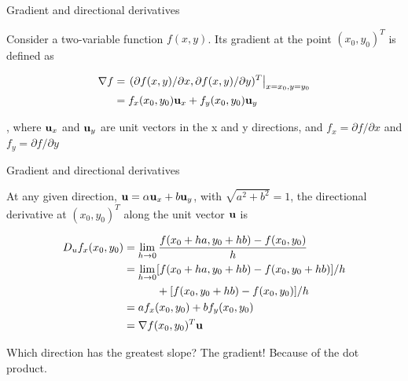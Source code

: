 \documentclass[notes]{beamer}
\begin{document}
\begin{frame}{Gradient and directional derivatives}

Consider a two-variable function \(f(x,y)\). Its gradient at the point
\((x_0 ,y_0)^T\) is defined as

\begin{equation*}
    \begin{aligned}
        \nabla f & = \left. (\partial f(x,y) / \partial x , \partial f(x,y) / \partial y)^T \right|_{x=x_0,y=y_0}   \\ 
        & = f_x(x_0,y_0) \mathbf{u}_x + f_y(x_0,y_0) \mathbf{u}_y 
    \end{aligned}
\end{equation*}

, where \(\mathbf{u}_x\) and \(\mathbf{u}_y\) are unit vectors in the x and y
directions, and \(f_x=\partial f / \partial x\) and
\(f_y = \partial f / \partial y\)

\end{frame}

\begin{frame}{Gradient and directional derivatives}

At any given direction, \(\mathbf{u} = \alpha \mathbf{u}_x + b \mathbf{u}_y\), with
\(\sqrt{a^2+b^2}=1\), the directional derivative at \((x_0, y_0 )^T\)
along the unit vector \(\mathbf{u}\) is

\begin{equation*}
    \begin{aligned}
        D_u f_x(x_0,y_0) &= \lim_{h \rightarrow 0} \frac{f(x_0 + ha, y_0+hb)-f(x_0,y_0) }{h} \\  
        &= \lim_{h \rightarrow 0} [f(x_0+ha , y_0 +hb)-f(x_0,y_0+hb)]/h \\
         &\qquad \quad +[f(x_0,y_0+hb)-f(x_0,y_0)]/{h} \\
        &= af_x(x_0,y_0)+bf_y(x_0,y_0) \\
        &= \nabla f(x_0,y_0)^T \mathbf{u}
    \end{aligned}
\end{equation*}

Which direction has the greatest slope? The gradient! Because of the dot
product.

\end{frame}
\end{document}
